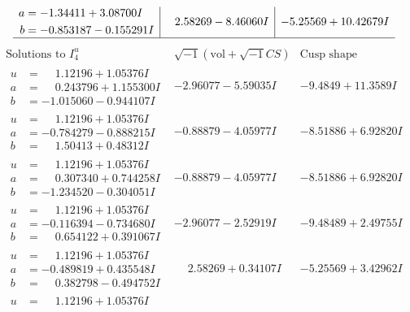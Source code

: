 \documentclass[1p]{elsarticle_modified}
\theoremstyle{definition}
\newcommand{\I}{\sqrt{-1}}
\begin{document}
$$\begin{array}{c|c|c}
\begin{aligned}
a &= -1.34411 + 3.08700 I \\
b &= -0.853187 - 0.155291 I\end{aligned}
 & \phantom{-}2.58269 - 8.46060 I & -5.25569 + 10.42679 I\\
 \hline 
 \end{array}$$\newpage$$\begin{array}{c|c|c}  
\text{Solutions to }I^u_{4}& \I (\text{vol} + \sqrt{-1}CS) & \text{Cusp shape}\\
 \hline 
\begin{aligned}
u &= \phantom{-}1.12196 + 1.05376 I \\
a &= \phantom{-}0.243796 + 1.155300 I \\
b &= -1.015060 - 0.944107 I\end{aligned}
 & -2.96077 - 5.59035 I & -9.4849 + 11.3589 I \\ \hline\begin{aligned}
u &= \phantom{-}1.12196 + 1.05376 I \\
a &= -0.784279 - 0.888215 I \\
b &= \phantom{-}1.50413 + 0.48312 I\end{aligned}
 & -0.88879 - 4.05977 I & -8.51886 + 6.92820 I \\ \hline\begin{aligned}
u &= \phantom{-}1.12196 + 1.05376 I \\
a &= \phantom{-}0.307340 + 0.744258 I \\
b &= -1.234520 - 0.304051 I\end{aligned}
 & -0.88879 - 4.05977 I & -8.51886 + 6.92820 I \\ \hline\begin{aligned}
u &= \phantom{-}1.12196 + 1.05376 I \\
a &= -0.116394 - 0.734680 I \\
b &= \phantom{-}0.654122 + 0.391067 I\end{aligned}
 & -2.96077 - 2.52919 I & -9.48489 + 2.49755 I \\ \hline\begin{aligned}
u &= \phantom{-}1.12196 + 1.05376 I \\
a &= -0.489819 + 0.435548 I \\
b &= \phantom{-}0.382798 - 0.494752 I\end{aligned}
 & \phantom{-}2.58269 + 0.34107 I & -5.25569 + 3.42962 I \\ \hline\begin{aligned}
u &= \phantom{-}1.12196 + 1.05376 I \\

\end{aligned}
\end{array}$$
\end{document}
